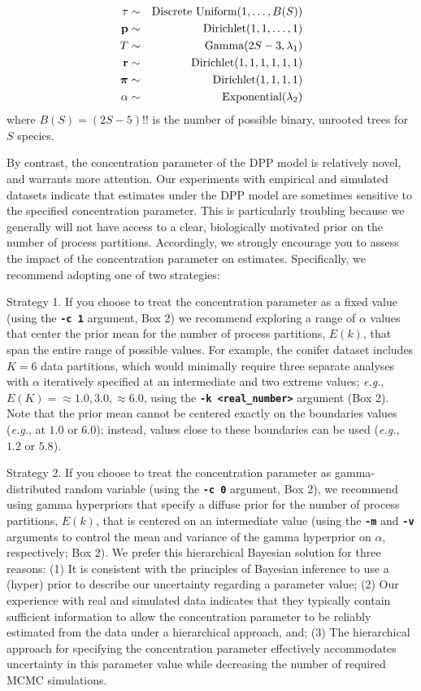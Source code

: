 \documentclass[11pt]{article}
\newcommand{\cl}[1]{{\texttt{\textbf{#1}}}}
\begin{document}
\begin{eqnarray*}
\tau & \sim & \mbox{Discrete Uniform}(1, \ldots, B(S)) \\
{\mathbf p} & \sim & \mbox{Dirichlet}(1, 1, \ldots, 1) \\
T & \sim & \mbox{Gamma}(2S-3, \lambda_1) \\
{\mathbf r} & \sim & \mbox{Dirichlet}(1,1,1,1,1,1) \\
\mbox{\boldmath$\pi$\unboldmath} & \sim & \mbox{Dirichlet}(1,1,1,1) \\
\alpha & \sim & \mbox{Exponential}(\lambda_2)
\end{eqnarray*}
where $B(S)=(2S-5)!!$ is the number of possible binary, unrooted trees for $S$ species.

By contrast, the concentration parameter of the DPP model is relatively novel, and warrants more attention. 
Our experiments with empirical and simulated datasets indicate that estimates under the DPP model are sometimes sensitive to the specified concentration parameter. 
This is particularly troubling because we generally will not have access to a clear, biologically motivated prior on the number of process partitions. 
Accordingly, we strongly encourage you to assess the impact of the concentration parameter on estimates. 
Specifically, we recommend adopting one of two strategies:

Strategy 1. If you choose to treat the concentration parameter as a fixed value (using the \cl{-c 1} argument, Box 2) we recommend exploring a range of $\alpha$ values that center the prior mean for the number of process partitions, $E(k)$, that span the entire range of possible values. 
For example, the conifer dataset includes $K = 6$ data partitions, which would minimally require three separate analyses with $\alpha$ iteratively specified at an intermediate and two extreme values; {\it e.g.}, $E(K) = {\approx 1.0, 3.0, \approx 6.0}$, using the \cl{-k <real\_number>} argument (Box 2). 
Note that the prior mean cannot be centered exactly on the boundaries values ({\it e.g.}, at $1.0$ or $6.0$); instead, values close to these boundaries can be used ({\it e.g.}, $1.2$ or $5.8$).

Strategy 2. If you choose to treat the concentration parameter as gamma-distributed random variable (using the \cl{-c 0} argument, Box 2), we recommend using gamma hyperpriors that specify a diffuse prior for the number of process partitions, $E(k)$, that is centered on an intermediate value (using the \cl{-m} and \cl{-v} arguments to control the mean and variance of the gamma hyperprior on $\alpha$, respectively; Box 2). 
We prefer this hierarchical Bayesian solution for three reasons: (1) It is consistent with the principles of Bayesian inference to use a (hyper) prior to describe our uncertainty regarding a parameter value; (2) Our experience with real and simulated data indicates that they typically contain sufficient information to allow the concentration parameter to be reliably estimated from the data under a hierarchical approach, and; (3) The hierarchical approach for specifying the concentration parameter effectively accommodates uncertainty in this parameter value while decreasing the number of required MCMC simulations.
\end{document}
